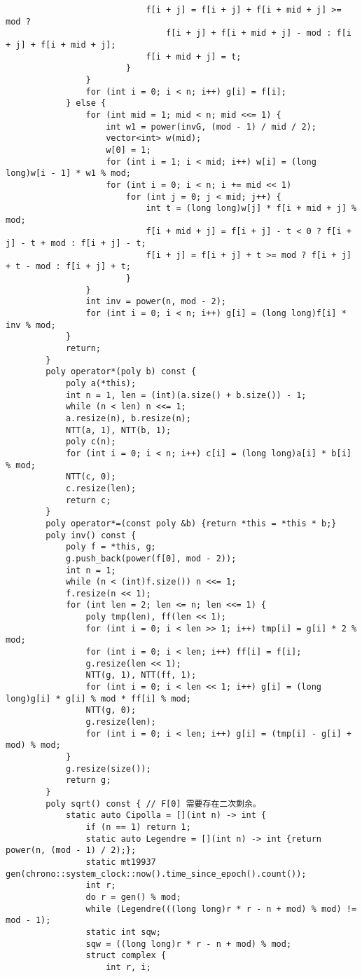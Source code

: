 \begin{verbatim}
                            f[i + j] = f[i + j] + f[i + mid + j] >= mod ?
                                f[i + j] + f[i + mid + j] - mod : f[i + j] + f[i + mid + j];
                            f[i + mid + j] = t;
                        }
                }
                for (int i = 0; i < n; i++) g[i] = f[i];
            } else {
                for (int mid = 1; mid < n; mid <<= 1) {
                    int w1 = power(invG, (mod - 1) / mid / 2);
                    vector<int> w(mid);
                    w[0] = 1;
                    for (int i = 1; i < mid; i++) w[i] = (long long)w[i - 1] * w1 % mod;
                    for (int i = 0; i < n; i += mid << 1)
                        for (int j = 0; j < mid; j++) {
                            int t = (long long)w[j] * f[i + mid + j] % mod;
                            f[i + mid + j] = f[i + j] - t < 0 ? f[i + j] - t + mod : f[i + j] - t;
                            f[i + j] = f[i + j] + t >= mod ? f[i + j] + t - mod : f[i + j] + t;
                        }
                }
                int inv = power(n, mod - 2);
                for (int i = 0; i < n; i++) g[i] = (long long)f[i] * inv % mod;
            }
            return;
        }
        poly operator*(poly b) const {
            poly a(*this);
            int n = 1, len = (int)(a.size() + b.size()) - 1;
            while (n < len) n <<= 1;
            a.resize(n), b.resize(n);
            NTT(a, 1), NTT(b, 1);
            poly c(n);
            for (int i = 0; i < n; i++) c[i] = (long long)a[i] * b[i] % mod;
            NTT(c, 0);
            c.resize(len);
            return c;
        }
        poly operator*=(const poly &b) {return *this = *this * b;}
        poly inv() const {
            poly f = *this, g;
            g.push_back(power(f[0], mod - 2));
            int n = 1;
            while (n < (int)f.size()) n <<= 1;
            f.resize(n << 1);
            for (int len = 2; len <= n; len <<= 1) {
                poly tmp(len), ff(len << 1);
                for (int i = 0; i < len >> 1; i++) tmp[i] = g[i] * 2 % mod;
                for (int i = 0; i < len; i++) ff[i] = f[i];
                g.resize(len << 1);
                NTT(g, 1), NTT(ff, 1);
                for (int i = 0; i < len << 1; i++) g[i] = (long long)g[i] * g[i] % mod * ff[i] % mod;
                NTT(g, 0);
                g.resize(len);
                for (int i = 0; i < len; i++) g[i] = (tmp[i] - g[i] + mod) % mod;
            }
            g.resize(size());
            return g;
        }
        poly sqrt() const { // F[0] 需要存在二次剩余。
            static auto Cipolla = [](int n) -> int {
                if (n == 1) return 1;
                static auto Legendre = [](int n) -> int {return power(n, (mod - 1) / 2);};
                static mt19937 gen(chrono::system_clock::now().time_since_epoch().count());
                int r;
                do r = gen() % mod;
                while (Legendre(((long long)r * r - n + mod) % mod) != mod - 1);
                static int sqw;
                sqw = ((long long)r * r - n + mod) % mod;
                struct complex {
                    int r, i;


\end{verbatim}
